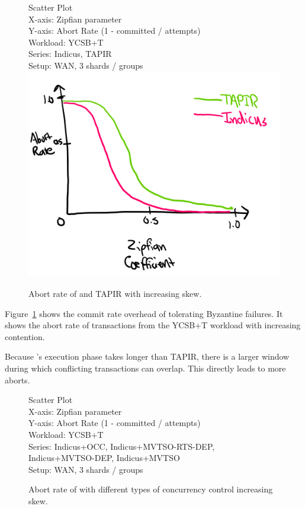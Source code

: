 \begin{figure}
  Scatter Plot\\
  X-axis: Zipfian parameter\\
  Y-axis: Abort Rate (1 - committed / attempts)\\
  Workload: YCSB+T\\
  Series: Indicus, TAPIR\\
  Setup: WAN, 3 shards / groups\\
  \includegraphics[width=\columnwidth]{figures/eval/bft-overhead-aborts.png}
  \caption{Abort rate of \sys{} and TAPIR with increasing skew.}
  \label{fig:bft-overhead-aborts}
\end{figure}

Figure~\ref{fig:bft-overhead-aborts} shows the commit rate overhead of tolerating
Byzantine failures. It shows the abort rate of transactions from the YCSB+T
workload with increasing contention. 

Because \sys{}'s execution phase takes longer than TAPIR, there is a larger
window during which conflicting transactions can overlap. This directly leads
to more aborts.

\begin{figure}
  Scatter Plot\\
  X-axis: Zipfian parameter\\
  Y-axis: Abort Rate (1 - committed / attempts)\\
  Workload: YCSB+T\\
  Series: Indicus+OCC, Indicus+MVTSO-RTS-DEP, Indicus+MVTSO-DEP, Indicus+MVTSO\\
  Setup: WAN, 3 shards / groups\\
  \caption{Abort rate of \sys{} with different types of concurrency control
  increasing skew.}
  \label{fig:cc-aborts}
\end{figure}

